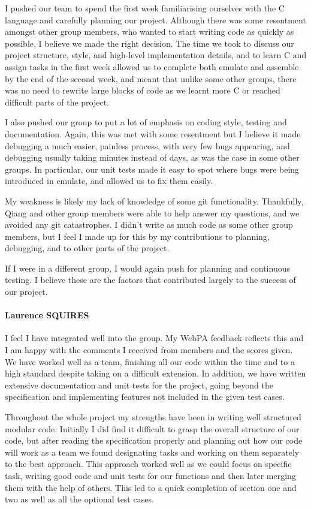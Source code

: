 \documentclass[10pt]{article}
\begin{document}
I pushed our team to spend the first week familiarising ourselves with the C language and carefully planning our project. Although there was some resentment amongst other group members, who wanted to start writing code as quickly as possible, I believe we made the right decision. The time we took to discuss our project structure, style, and high-level implementation details, and to learn C and assign tasks in the first week allowed us to complete both emulate and assemble by the end of the second week, and meant that unlike some other groups, there was no need to rewrite large blocks of code as we learnt more C or reached difficult parts of the project.

I also pushed our group to put a lot of emphasis on coding style, testing and documentation. Again, this was met with some resentment but I believe it made debugging a much easier, painless process, with very few bugs appearing, and debugging usually taking minutes instead of days, as was the case in some other groups. In particular, our unit tests made it easy to spot where bugs were being introduced in emulate, and allowed us to fix them easily.

My weakness is likely my lack of knowledge of some git functionality. Thankfully, Qiang and other group members were able to help answer my questions, and we avoided any git catastrophes. I didn't write as much code as some other group members, but I feel I made up for this by my contributions to planning, debugging, and to other parts of the project.

If I were in a different group, I would again push for planning and continuous testing. I believe these are the factors that contributed largely to the success of our project.

\paragraph{Laurence SQUIRES}
I feel I have integrated well into the group. My WebPA feedback reflects this and I am happy with the comments I received from members and the scores given. We have worked well as a team, finishing all our code within the time and to a high standard despite taking on a difficult extension. In addition, we have written extensive documentation and unit tests for the project, going beyond the specification and implementing features not included in the given test cases. 

Throughout the whole project my strengths have been in writing well structured modular code. Initially I did find it difficult to grasp the overall structure of our code, but after reading the specification properly and planning out how our code will work as a team we found designating tasks and working on them separately to the best approach. This approach worked well as we could focus on specific task, writing good code and unit tests for our functions and then later merging them with the help of others. This led to a quick completion of section one and two as well as all the optional test cases.
\end{document}
